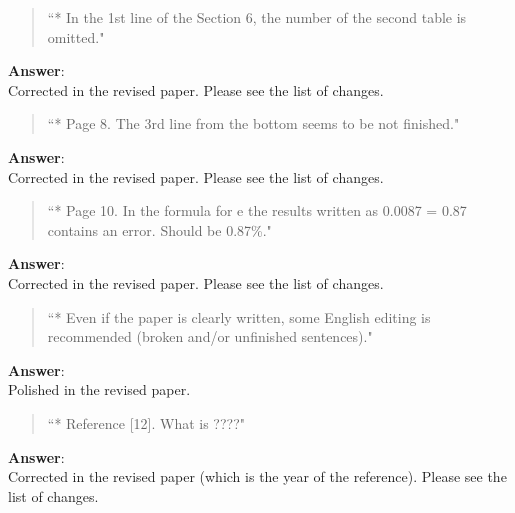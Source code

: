 \documentclass{article}
\begin{document}
\begin{quote}
    ``* In the 1st line of the Section 6, the number of the second table is omitted."
\end{quote}
\textbf{Answer}: \\
Corrected in the revised paper. Please see the list of changes. 

\begin{quote}
    ``* Page 8. The 3rd line from the bottom seems to be not finished."
\end{quote}
\textbf{Answer}: \\
Corrected in the revised paper. Please see the list of changes. 

\begin{quote}
    ``* Page 10. In the formula for e the results written as 0.0087 = 0.87 contains an error. Should be 0.87\%."
\end{quote}
\textbf{Answer}: \\
Corrected in the revised paper. Please see the list of changes. 

\begin{quote}
    ``* Even if the paper is clearly written, some English editing is recommended (broken and/or unfinished sentences)."
\end{quote}
\textbf{Answer}: \\
Polished in the revised paper. 

\begin{quote}
    ``* Reference [12]. What is ????"
\end{quote}
\textbf{Answer}: \\
Corrected in the revised paper (which is the year of the reference). Please see the list of changes. 
\end{document}
